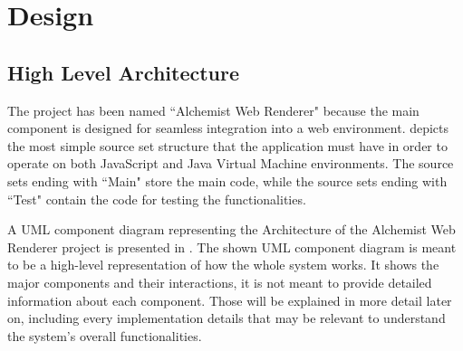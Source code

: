 \chapter{Design}
\label{chap:design}
\section{High Level Architecture}
\label{sec:high-level-architecture}
The project has been named ``Alchemist Web Renderer" because the main component is designed for seamless integration into a web environment.  depicts the most simple source set structure that the application must have in order to operate on both JavaScript and Java Virtual Machine environments. The source sets ending with ``Main" store the main code, while the source sets ending with ``Test" contain the code for testing the functionalities.


A UML component diagram representing the Architecture of the Alchemist Web Renderer project is presented in . The shown UML component diagram is meant to be a high-level representation of how the whole system works. It shows the major components and their interactions, it is not meant to provide detailed information about each component. Those will be explained in more detail later on, including every implementation details that may be relevant to understand the system's overall functionalities.\newline


